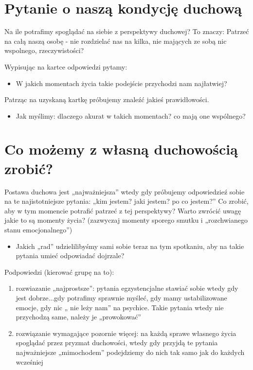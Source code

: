 \documentclass[a5paper,10pt,polish]{book}
\begin{document}
\section{Pytanie  o naszą kondycję duchową}
\label{babice2006-wiosna-knurow/spotkanie1:pytanie-o-nasza-kondycje-duchowa}
Na ile potrafimy spoglądać na siebie z perspektywy duchowej? To znaczy: Patrzeć na całą naszą osobę - nie rozdzielać nas na kilka, nie mających ze sobą nic wspolnego, rzeczywistości?

Wypisując na kartce odpowiedzi pytamy:
\begin{itemize}
\item {} 
W jakich momentach życia takie podejście przychodzi nam najłatwiej?

\end{itemize}

Patrząc na uzyskaną kartkę próbujemy znaleźć jakieś prawidłowości.
\begin{itemize}
\item {} 
Jak myślimy: dlaczego akurat w takich momentach? co mają one wspólnego?

\end{itemize}


\section{Co możemy z własną duchowością zrobić?}
\label{babice2006-wiosna-knurow/spotkanie1:co-mozemy-z-wlasna-duchowoscia-zrobic}
Postawa duchowa jest „najważniejsza” wtedy gdy próbujemy odpowiedzieź sobie na te najistotniejsze pytania: „kim jestem? jaki jestem? po co jestem?” Co zrobić, aby w tym momencie potrafić patrzeć z tej perspektywy? Warto zwrócić uwagę jakie to są  momenty  życia? (zazwyczaj  momenty  sporego smutku i „rozchwianego stanu emocjonalnego”)
\begin{itemize}
\item {} 
Jakich „rad” udzielilibyśmy sami sobie teraz na tym spotkaniu, aby na takie pytania umieć odpowiadać dojrzale?

\end{itemize}

Podpowiedzi (kierować grupę na to):
\begin{enumerate}
\item {} 
rozwiazanie „najprostsze”: pytania egzystencjalne stawiać sobie wtedy gdy jest dobrze...gdy potrafimy sprawnie myśleć, gdy mamy ustabilizowane emocje, gdy nic „ nie leży nam” na psychice. Takie pytania wtedy nie przychodzą same, należy je „prowokować”

\item {} 
rozwiązanie wymagające pozornie więcej: na każdą sprawe  własnego życia spoglądać przez pryzmat duchowości, wtedy gdy przyjdą te pytania najważniejsze „mimochodem” podejdziemy do nich tak samo jak do każdych wcześniej

\end{enumerate}
\end{document}
